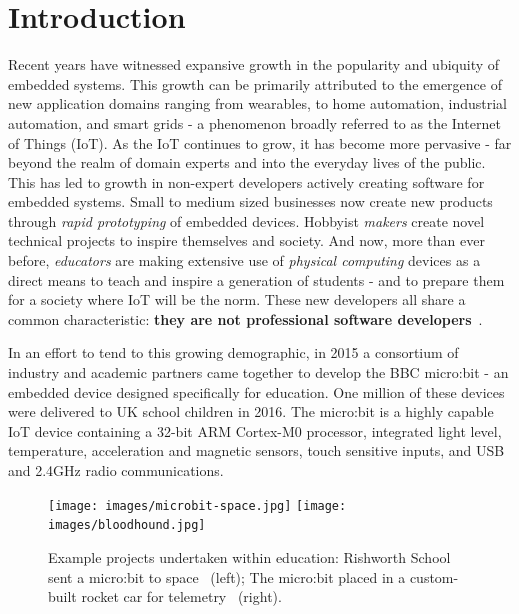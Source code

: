 \section{Introduction}
\label{sec:intro}

Recent years have witnessed expansive growth in the popularity and ubiquity of embedded systems. This growth can be primarily attributed to the emergence of new application domains ranging from wearables, to home automation, industrial automation, and smart grids - a phenomenon broadly referred to as the Internet of Things (IoT). As the IoT continues to grow, it has become more pervasive - far beyond the realm of domain experts and into the everyday lives of the public. This has led to growth in non-expert developers actively creating software for embedded systems. Small to medium sized businesses now create new products through \emph{rapid prototyping} of embedded devices. Hobbyist \emph{makers} create novel technical projects to inspire themselves and society. And now, more than ever before, \emph{educators} are making extensive use of \emph{physical computing} devices as a direct means to teach and inspire a generation of students - and to prepare them for a society where IoT will be the norm. These new developers all share a common characteristic: \textbf{they are not professional software developers}~\cite{dougherty2012maker,bruce2015make,maksimovic2014raspberry}.

In an effort to tend to this growing demographic, in 2015 a consortium of industry and academic partners came together to develop the BBC micro:bit - an embedded device designed specifically for education. One million of these devices were delivered to UK school children in 2016. The micro:bit is a highly capable IoT device containing a 32-bit ARM Cortex-M0 processor, integrated light level, temperature, acceleration and magnetic sensors, touch sensitive inputs, and USB and 2.4GHz radio communications.

\begin{figure}[t]
    \centering
    \texttt{[image: images/microbit-space.jpg]}
    \texttt{[image: images/bloodhound.jpg]}
    \setlength{\belowcaptionskip}{-10pt}
    \caption{\label{fig:projects} Example projects undertaken within education: Rishworth School sent a micro:bit to space~\cite{microbit79:online} (left); The micro:bit placed in a custom-built rocket car for telemetry~\cite{microbit73:online, microsoft:online} (right).}
    \vspace{-5pt}
\end{figure}

